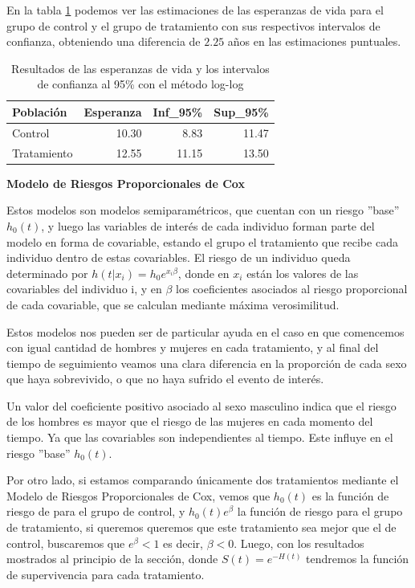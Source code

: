 \documentclass[12pt]{article}
\begin{document}
En la tabla \ref{Tabla:8} podemos ver las estimaciones de las esperanzas de vida para el grupo de control y el grupo de tratamiento con sus respectivos intervalos de confianza, obteniendo una diferencia de $2.25$ años en las estimaciones puntuales.

\begin{table}[ht]
\centering
\begin{tabular}{lrrr}
  \hline
 Población & Esperanza & Inf\_95\% & Sup\_95\% \\ 
  \hline
Control & 10.30 & 8.83 & 11.47 \\ 
Tratamiento & 12.55 & 11.15 & 13.50 \\ 
   \hline
\end{tabular}
\caption{Resultados de las esperanzas de vida y los intervalos de confianza al 95\% con el método log-log}
\label{Tabla:8}
\end{table}

\begin{center}
    \textbf{Modelo de Riesgos Proporcionales de Cox}
\end{center}

Estos modelos son modelos semiparamétricos, que cuentan con un riesgo ''base'' $h_0(t)$, y luego las variables de interés de cada individuo forman parte del modelo en forma de covariable, estando el grupo el tratamiento que recibe cada individuo dentro de estas covariables. El riesgo de un individuo queda determinado por $h(t|x_i)=h_0e^{x_i\beta}$, donde en $x_i$ están los valores de las covariables del individuo i, y en $\beta$ los coeficientes asociados al riesgo proporcional de cada covariable, que se calculan mediante máxima verosimilitud.\

Estos modelos nos pueden ser de particular ayuda en el caso en que comencemos con igual cantidad de hombres y mujeres en cada tratamiento, y al final del tiempo de seguimiento veamos una clara diferencia en la proporción de cada sexo que haya sobrevivido, o que no haya sufrido el evento de interés.\

Un valor del coeficiente positivo asociado al sexo masculino indica que el riesgo de los hombres es mayor que el riesgo de las mujeres en cada momento del tiempo. Ya que las covariables son independientes al tiempo. Este influye en el riesgo ''base'' $h_0(t)$.\

Por otro lado, si estamos comparando únicamente dos tratamientos mediante el Modelo de Riesgos Proporcionales de Cox, vemos que $h_0(t)$ es la función de riesgo de para el grupo de control, y $h_0(t)e^{\beta}$ la función de riesgo para el grupo de tratamiento, si queremos queremos que este tratamiento sea mejor que el de control, buscaremos que $e^\beta<1$ es decir, $\beta<0$. Luego, con los resultados mostrados al principio de la sección, donde $S(t)=e^{-H(t)}$ tendremos la función de supervivencia para cada tratamiento. 
\end{document}
